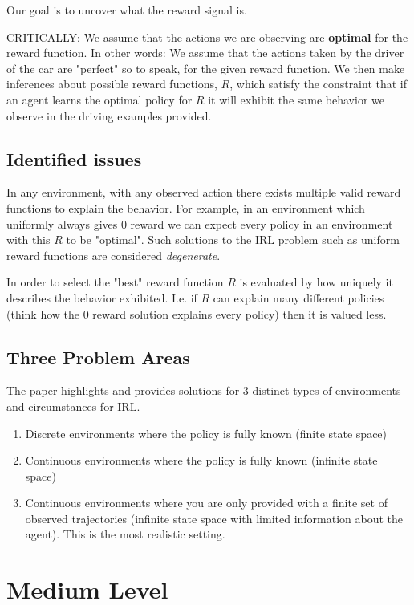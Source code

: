 \documentclass{article}
\begin{document}
    Our goal is to uncover what the reward signal is.


    CRITICALLY: We assume that the actions we are observing are \textbf{optimal} for the reward function. In other words: We assume that the actions taken by the driver of the car are "perfect" so to speak, for the given reward function. 
    We then make inferences about possible reward functions, $R$, which satisfy the constraint that if an agent learns the optimal policy for $R$ it will exhibit the same behavior we observe in the driving examples provided. 


    \subsection{Identified issues}
    In any environment, with any observed action there exists multiple valid reward functions to explain the behavior. For example, in an environment which uniformly always gives 0 reward we can expect every policy in an environment with this $R$ to be "optimal". Such solutions to the IRL problem such as uniform reward functions are considered \emph{degenerate}.
    
    In order to select the "best" reward function $R$ is evaluated by how uniquely it describes the behavior exhibited. I.e. if $R$ can explain many different policies (think how the 0 reward solution explains every policy) then it is valued less.


    \subsection{Three Problem Areas}
    The paper highlights and provides solutions for 3 distinct types of environments and circumstances for IRL.
    \begin{enumerate} 
        \item Discrete environments where the policy is fully known (finite state space)
        \item Continuous environments where the policy is fully known (infinite state space)
        \item Continuous environments where you are only provided with a finite set of observed trajectories (infinite state space with limited information about the agent). This is the most realistic setting.
    \end{enumerate}

    \section{Medium Level}
    
\end{document}
